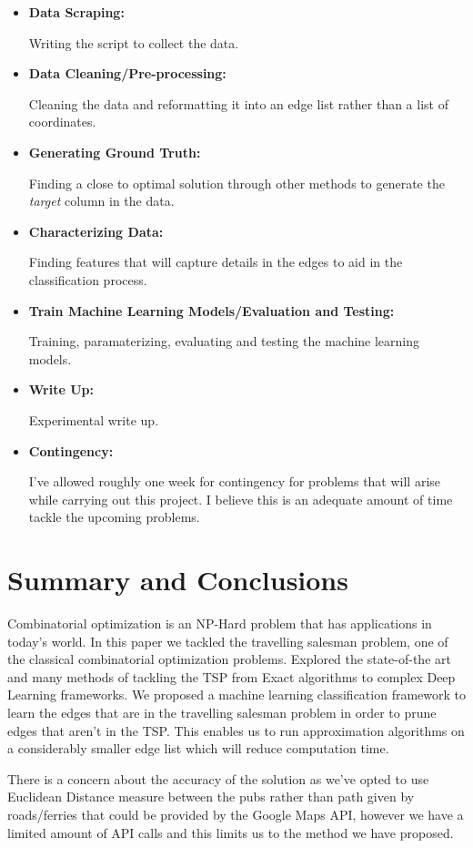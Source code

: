 \documentclass[]{UCD_CS_FYP_Report}
\begin{document}
\begin{itemize}
    \item \textbf{Data Scraping: }
    
    Writing the script to collect the data.
    \item \textbf{Data Cleaning/Pre-processing: }
    
    Cleaning the data and reformatting it into an edge list rather than a list of coordinates.
    \item \textbf{Generating Ground Truth: }
    
    Finding a close to optimal solution through other methods to generate the \textit{target} column in the data.
    \item \textbf{Characterizing Data: }
    
    Finding features that will capture details in the edges to aid in the classification process.
    \item \textbf{Train Machine Learning Models/Evaluation and Testing: }
    
    Training, paramaterizing, evaluating and testing the machine learning models.
    \item \textbf{Write Up: }
    
    Experimental write up.
    \item \textbf{Contingency: }
    
    I've allowed roughly one week for contingency for problems that will arise while carrying out this project. I believe this is an adequate amount of time tackle the upcoming problems.
\end{itemize}

\chapter{Summary and Conclusions}
Combinatorial optimization is an NP-Hard problem that has applications in today’s world. In this paper we tackled the travelling salesman problem, one of the classical combinatorial optimization problems. Explored the state-of-the art and many methods of tackling the TSP from Exact algorithms to complex Deep Learning frameworks. We proposed a machine learning classification framework to learn the edges that are in the travelling salesman problem in order to prune edges that aren’t in the TSP. This enables us to run approximation algorithms on a considerably smaller edge list which will reduce computation time. 

There is a concern about the accuracy of the solution as we’ve opted to use Euclidean Distance measure between the pubs rather than path given by roads/ferries that could be provided by the Google Maps API, however we have a limited amount of API calls and this limits us to the method we have proposed.
\end{document}
